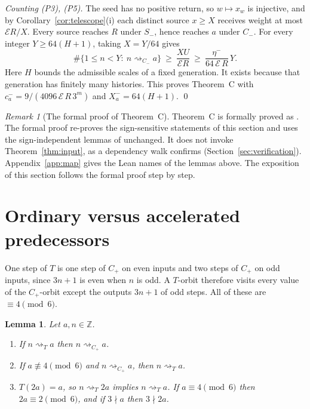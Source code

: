 \documentclass[11pt]{amsart}
\newtheorem{lemma}[theorem]{Lemma}
\theoremstyle{definition}
\theoremstyle{remark}
\newtheorem{remark}[theorem]{Remark}
\newcommand{\Z}{\mathbb{Z}}
\newcommand{\Cp}{C_{+}}
\newcommand{\Cm}{C_{-}}
\newcommand{\Sm}{S_{-}}
\newcommand{\reach}[1]{\mathrel{\rightsquigarrow_{#1}}}
\newcommand{\E}{\mathcal{E}}
\begin{document}
\emph{Counting (P3), (P5).} The seed has no positive return, so $w\mapsto x_w$ is injective, and by
Corollary~\ref{cor:telescope}(i) each distinct source $x\ge X$ receives weight at most $\E R/X$.
Every source reaches $R$ under $\Sm$, hence reaches $a$ under $\Cm$. For every integer
$Y\ge64(H+1)$, taking $X=Y/64$ gives
\[
  \#\{1\le n<Y:\ n\reach{\Cm}a\}\ \ge\ \frac{XU}{\E R}\ \ge\ \frac{\eta^{-}}{64\,\E\,R}\,Y .
\]
Here $H$ bounds the admissible scales of a fixed generation. It exists because that generation has
finitely many histories. This proves Theorem~C with $c^{-}_a=9/(4096\,\E\,R\,3^{m})$ and
$X^{-}_a=64(H+1)$. \qed

\begin{remark}[The formal proof of Theorem~C]\label{rem:formal-C}
Theorem~C is formally proved as . The formal proof re-proves the
sign-sensitive statements of this section and uses the sign-independent lemmas of
\cite{MazurM1,MazurM2} unchanged. It does not invoke Theorem~\ref{thm:input}, as a dependency walk confirms
(Section~\ref{sec:verification}).
Appendix~\ref{app:map} gives the Lean names of the lemmas above. The exposition of this section
follows the formal proof step by step.
\end{remark}

\section{Ordinary versus accelerated predecessors}\label{sec:accel}

One step of $T$ is one step of $\Cp$ on even inputs and two steps of $\Cp$ on odd inputs, since
$3n+1$ is even when $n$ is odd. A $T$-orbit therefore visits every value of the $\Cp$-orbit except
the outputs $3n+1$ of odd steps. All of these are $\equiv4\pmod6$.

\begin{lemma}\label{lem:bridge}
Let $a,n\in\Z$.
\begin{enumerate}[leftmargin=*,label=(\roman*)]
\item If $n\reach{T}a$ then $n\reach{\Cp}a$.
\item If $a\not\equiv4\pmod6$ and $n\reach{\Cp}a$, then $n\reach{T}a$.
\item $T(2a)=a$, so $n\reach{T}2a$ implies $n\reach{T}a$. If $a\equiv4\pmod6$ then
  $2a\equiv2\pmod6$, and if $3\nmid a$ then $3\nmid2a$.
\end{enumerate}
\end{lemma}
\end{document}
